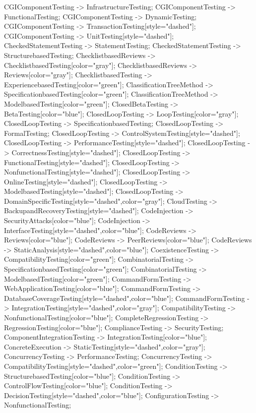\documentclass{article}
\begin{document}
{CGIComponentTesting -> InfrastructureTesting;
CGIComponentTesting -> FunctionalTesting;
CGIComponentTesting -> DynamicTesting;
CGIComponentTesting -> TransactionTesting[style="dashed"];
CGIComponentTesting -> UnitTesting[style="dashed"];
CheckedStatementTesting -> StatementTesting;
CheckedStatementTesting -> StructurebasedTesting;
ChecklistbasedReviews -> ChecklistbasedTesting[color="gray"];
ChecklistbasedReviews -> Reviews[color="gray"];
ChecklistbasedTesting -> ExperiencebasedTesting[color="green"];
ClassificationTreeMethod -> SpecificationbasedTesting[color="green"];
ClassificationTreeMethod -> ModelbasedTesting[color="green"];
ClosedBetaTesting -> BetaTesting[color="blue"];
ClosedLoopTesting -> LoopTesting[color="gray"];
ClosedLoopTesting -> SpecificationbasedTesting;
ClosedLoopTesting -> FormalTesting;
ClosedLoopTesting -> ControlSystemTesting[style="dashed"];
ClosedLoopTesting -> PerformanceTesting[style="dashed"];
ClosedLoopTesting -> CorrectnessTesting[style="dashed"];
ClosedLoopTesting -> FunctionalTesting[style="dashed"];
ClosedLoopTesting -> NonfunctionalTesting[style="dashed"];
ClosedLoopTesting -> OnlineTesting[style="dashed"];
ClosedLoopTesting -> ModelbasedTesting[style="dashed"];
ClosedLoopTesting -> DomainSpecificTesting[style="dashed",color="gray"];
CloudTesting -> BackupandRecoveryTesting[style="dashed"];
CodeInjection -> SecurityAttacks[color="blue"];
CodeInjection -> InterfaceTesting[style="dashed",color="blue"];
CodeReviews -> Reviews[color="blue"];
CodeReviews -> PeerReviews[color="blue"];
CodeReviews -> StaticAnalysis[style="dashed",color="blue"];
CoexistenceTesting -> CompatibilityTesting[color="green"];
CombinatorialTesting -> SpecificationbasedTesting[color="green"];
CombinatorialTesting -> ModelbasedTesting[color="green"];
CommandFormTesting -> WebApplicationTesting[color="blue"];
CommandFormTesting -> DatabaseCoverageTesting[style="dashed",color="blue"];
CommandFormTesting -> IntegrationTesting[style="dashed",color="gray"];
CompatibilityTesting -> NonfunctionalTesting[color="blue"];
CompleteRegressionTesting -> RegressionTesting[color="blue"];
ComplianceTesting -> SecurityTesting;
ComponentIntegrationTesting -> IntegrationTesting[color="blue"];
ConcreteExecution -> StaticTesting[style="dashed",color="gray"];
ConcurrencyTesting -> PerformanceTesting;
ConcurrencyTesting -> CompatibilityTesting[style="dashed",color="green"];
ConditionTesting -> StructurebasedTesting[color="blue"];
ConditionTesting -> ControlFlowTesting[color="blue"];
ConditionTesting -> DecisionTesting[style="dashed",color="blue"];
ConfigurationTesting -> NonfunctionalTesting;
}
\end{document}
